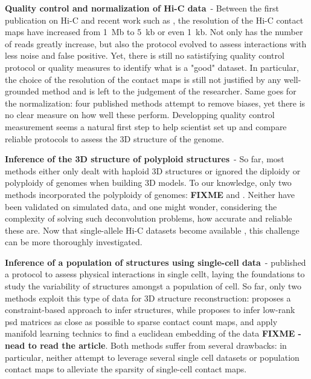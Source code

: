 \textbf{Quality control and normalization of Hi-C data}\ -
Between the first publication on Hi-C \citep{lieberman-aiden:comprehensive}
and recent work such as \citet{rao:3d, jin:high-resolution}, the resolution of
the Hi-C contact maps have increased from 1~Mb to 5~kb or even 1~kb. Not only
has the number of reads greatly increase, but also the protocol evolved to
assess interactions with less noise and false positive. Yet, there is still no
satistifying quality control protocol or quality measures to identify what is
a "good" dataset. In particular, the choice of the resolution of the contact
maps is still not justified by any well-grounded method and is left to the
judgement of the researcher. Same goes for the normalization: four published
methods attempt to remove biases, yet there is no clear measure on how well
these perform. Developping quality control measurement seems a natural first
step to help scientist set up and compare reliable protocols to assess the 3D
structure of the genome.

\textbf{Inference of the 3D structure of polyploid structures}\ - So far, most
methods either only dealt with haploid 3D structures or ignored the diploidy
or polyploidy of genomes when building 3D models. To our knowledge, only two
methods incorporated the polyploidy of genomes: \textbf{FIXME} and
\citet{ay:identifying}. Neither have been validated on simulated data, and
one might wonder, considering the complexity of solving such deconvolution
problems, how accurate and reliable these are. Now that single-allele Hi-C
datasets become available \citep{deng:bipartite}, this challenge can be more
thoroughly investigated.

\textbf{Inference of a population of structures using single-cell data}\ -
\citet{nagano:single-cell} published a protocol to assess physical
interactions in single cellt, laying the foundations to study the variability
of structures amongst a population of cell. So far, only two methods exploit
this type of data for 3D structure reconstruction: \citet{nagano:single-cell}
proposes a constraint-based approach to infer structures, while
\citet{paulsen:manifold} proposes to infer low-rank psd matrices as close as
possible to sparse contact count maps, and apply manifold learning technics to
find a euclidean embedding of the data \textbf{FIXME - nead to read the
article}. Both methods suffer from several drawbacks: in particular, neither
attempt to leverage several single cell datasets or population contact maps to
alleviate the sparsity of single-cell contact maps.


